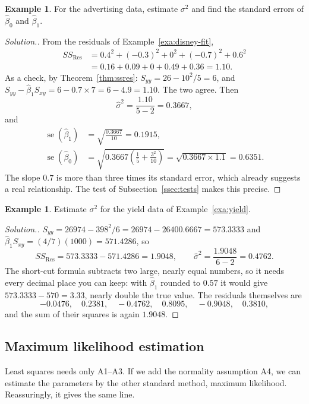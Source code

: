 \documentclass[11pt,a4paper]{article}
\numberwithin{equation}{section}
\theoremstyle{definition}
\newtheorem{exa}[thm]{Example}
\newenvironment{solution}
  {\renewcommand{\qedsymbol}{}\begin{proof}[\textit{Solution}.]}
  {\end{proof}}
\begin{document}
\begin{exa}\label{exa:disney-sigma}
For the advertising data, estimate $\sigma^2$ and find the standard errors of $\hat\beta_0$
and $\hat\beta_1$.
\end{exa}

\begin{solution}
From the residuals of Example~\ref{exa:disney-fit},
\begin{align*}
SS_{\mathrm{Res}} &= 0.4^2 + (-0.3)^2 + 0^2 + (-0.7)^2 + 0.6^2 \\
                  &= 0.16 + 0.09 + 0 + 0.49 + 0.36 = 1.10 .
\end{align*}
As a check, by Theorem~\ref{thm:ssres}: $S_{yy} = 26 - 10^2/5 = 6$, and
$S_{yy} - \hat\beta_1 S_{xy} = 6 - 0.7 \times 7 = 6 - 4.9 = 1.10$. The two agree. Then
\[
\hat\sigma^2 = \frac{1.10}{5 - 2} = 0.3667,
\]
and
\begin{align*}
\operatorname{se}(\hat\beta_1) &= \sqrt{\frac{0.3667}{10}} = 0.1915, \\
\operatorname{se}(\hat\beta_0) &= \sqrt{0.3667 \left( \frac15 + \frac{3^2}{10} \right)} = \sqrt{0.3667 \times 1.1} = 0.6351 .
\end{align*}
The slope $0.7$ is more than three times its standard error, which already suggests a real
relationship. The test of Subsection~\ref{ssec:tests} makes this precise.
\end{solution}

\begin{exa}
Estimate $\sigma^2$ for the yield data of Example~\ref{exa:yield}.
\end{exa}

\begin{solution}
$S_{yy} = 26974 - 398^2/6 = 26974 - 26400.6667 = 573.3333$ and
$\hat\beta_1 S_{xy} = (4/7)(1000) = 571.4286$, so
\[
SS_{\mathrm{Res}} = 573.3333 - 571.4286 = 1.9048, \qquad
\hat\sigma^2 = \frac{1.9048}{6 - 2} = 0.4762 .
\]
The short-cut formula subtracts two large, nearly equal numbers, so it needs every decimal
place you can keep: with $\hat\beta_1$ rounded to $0.57$ it would give
$573.3333 - 570 = 3.33$, nearly double the true value. The residuals themselves are
\[
-0.0476, \quad 0.2381, \quad -0.4762, \quad 0.8095, \quad -0.9048, \quad 0.3810,
\]
and the sum of their squares is again $1.9048$.
\end{solution}

\subsection{Maximum likelihood estimation}\label{ssec:mle}
Least squares needs only A1--A3. If we add the normality assumption A4, we can estimate the
parameters by the other standard method, maximum likelihood. Reassuringly, it gives the same
line.
\end{document}
